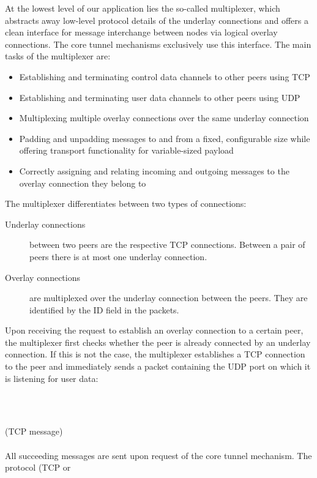 \documentclass{article}
\begin{document}
At the lowest level of our application lies the so-called multiplexer, which abstracts away
low-level protocol details of the underlay connections and offers a clean interface for message
interchange between nodes via logical overlay connections. The core tunnel mechanisms exclusively
use this interface. The main tasks of the multiplexer are:
\begin{itemize}
	\item Establishing and terminating control data channels to other peers using TCP
	\item Establishing and terminating user data channels to other peers using UDP
	\item Multiplexing multiple overlay connections over the same underlay connection
	\item Padding and unpadding messages to and from a fixed, configurable size while offering transport functionality for variable-sized payload
	\item Correctly assigning and relating incoming and outgoing messages to the overlay connection they belong to
\end{itemize}
The multiplexer differentiates between two types of connections:
\begin{description}
	\item[Underlay connections] between two peers are the respective TCP connections. Between a pair of peers there is at most one underlay connection.
	\item[Overlay connections] are multiplexed over the underlay connection between the peers. They are identified by the ID field in the packets.
\end{description}
Upon receiving the request to establish an overlay connection to a certain peer, the multiplexer
first checks whether the peer is already connected by an underlay connection. If this is not the
case, the multiplexer establishes a TCP connection to the peer and immediately sends a packet
containing the UDP port on which it is listening for user data: \\[8pt]
	\begin{bytefield}[bitwidth=1.0em]{32}
		 \\
	\end{bytefield} \\
(TCP message) \\
\hbox{} \\
All succeeding messages are sent upon request of the core tunnel mechanism. The protocol (TCP or
\end{document}
